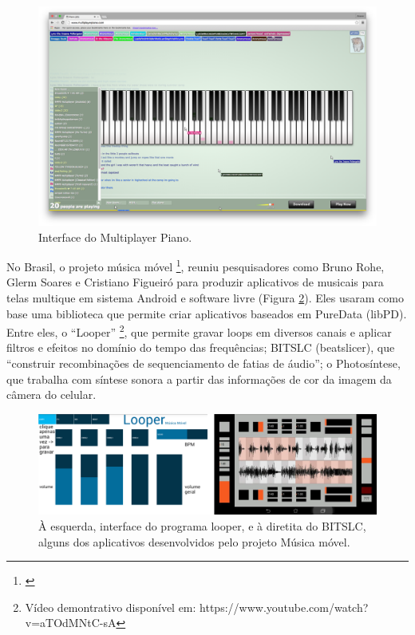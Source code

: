 {\begin{figure}
    \caption{\label{multiplayer}Interface do Multiplayer Piano.}
   
        \includegraphics[width=1\linewidth]{pictures/cap2/multiplayerpiano}
   
\end{figure}


No Brasil, o projeto música móvel \footnote{\cite{Rohde2014}}, reuniu pesquisadores como Bruno Rohe, Glerm Soares e Cristiano Figueiró para produzir aplicativos de musicais para telas multique em sistema Android e software livre (Figura \ref{mmovel}). Eles usaram como base uma biblioteca que permite criar aplicativos baseados em PureData (libPD). Entre eles, o ``Looper'' \footnote{Vídeo demontrativo disponível em: https://www.youtube.com/watch?v=aTOdMNtC-sA}, que permite gravar loops em diversos canais e aplicar filtros e efeitos no domínio do tempo das frequências; B\/I\/T\/S\/L\/C (beatslicer), que ``construir
recombinações de sequenciamento de fatias de áudio''; o Photosíntese, que trabalha com síntese sonora a partir das informações de cor da imagem da câmera do celular.

\begin{figure}
    \caption{\label{mmovel}À esquerda, interface do programa looper, e à diretita do B\/I\/T\/S\/L\/C, alguns dos aplicativos desenvolvidos pelo projeto Música móvel.}
    
        \includegraphics[width=1\linewidth]{pictures/cap2/musicamovel}
    

\end{figure}}
